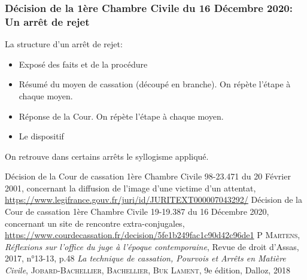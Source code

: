 \documentclass[math]{cours}
\begin{document}
\subsubsection{Décision de la 1ère Chambre Civile du 16 Décembre 2020: Un arrêt de rejet}
La structure d'un arrêt de rejet:
\begin{itemize}
	\item Exposé des faits et de la procédure
	\item Résumé du moyen de cassation (découpé en branche). On répète l'étape à chaque moyen.
	\item Réponse de la Cour. On répète l'étape à chaque moyen.
	\item Le dispositif
\end{itemize}
On retrouve dans certains arrêts le syllogisme appliqué.

\begin{thebibliography}{255}
	Décision de la Cour de cassation 1ère Chambre Civile 98-23.471 du 20 Février 2001, concernant la diffusion de l'image d'une victime d'un attentat,\\
	\url{https://www.legifrance.gouv.fr/juri/id/JURITEXT000007043292/}
	Décision de la Cour de cassation 1ère Chambre Civile 19-19.387 du 16 Décembre 2020, concernant un site de rencontre extra-conjugales,\\
	\url{https://www.courdecassation.fr/decision/5fe1b249fac1c90d42c96de1}
	P \textsc{Martens}, \textit{Réflexions sur l'office du juge à l'époque contemporaine},
	Revue de droit d'Assas, 2017, n°13-13, p.48
	\textit{La technique de cassation, \small{Pourvois et Arrêts en Matière Civile}}, \textsc{Jobard-Bachellier, Bachellier, Buk Lament}, 9e édition, Dalloz, 2018
\end{thebibliography}
\end{document}
